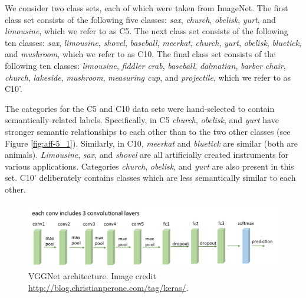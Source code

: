 
We consider two class sets, each of which were taken from ImageNet. The first
class set consists of the following five classes:
\emph{sax},
\emph{church},
\emph{obelisk},
\emph{yurt}, and
\emph{limousine}, which we refer to as C5.
The next class set consists of the following ten classes:
\emph{sax},
\emph{limousine},
\emph{shovel},
\emph{baseball},
\emph{meerkat},
\emph{church},
\emph{yurt},
\emph{obelisk},
\emph{bluetick}, and
\emph{mushroom}, which we refer to as C10.
The final class set consists of the following ten classes:
\emph{limousine},
\emph{fiddler crab},
\emph{baseball},
\emph{dalmatian},
\emph{barber chair},
\emph{church},
\emph{lakeside},
\emph{mushroom},
\emph{measuring cup}, and
\emph{projectile}, which we refer to as C10'.

The categories for the C5 and C10 data sets were hand-selected to contain
semantically-related labels. Specifically, in C5 \emph{church}, \emph{obelisk},
and \emph{yurt} have stronger semantic relationships to each other than to the
two other classes (see Figure \ref{fig:aff-5_1}).  Similarly, in C10,
\emph{meerkat} and \emph{bluetick} are similar (both are animals).
\emph{Limousine}, \emph{sax}, and \emph{shovel} are all artificially created
instruments for various applications.  Categories \emph{church}, \emph{obelisk},
and \emph{yurt} are also present in this set.  C10' deliberately contains
classes which are less semantically similar to each other.

\begin{figure}[t]
  \centering
  \includegraphics[width=1.0\textwidth]{figs/vgg16arch.png}
  \caption{
      VGGNet architecture. Image credit
      \url{http://blog.christianperone.com/tag/keras/}.
  }
  \label{fig:vgg16arch}
\end{figure}

